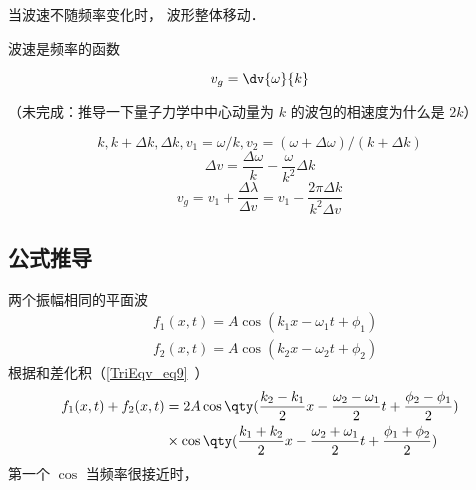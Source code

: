 
\begin{issues}
\issueDraft
\end{issues}


当波速不随频率变化时， 波形整体移动．

波速是频率的函数

\begin{equation}
v_g = \dv{\omega}{k}
\end{equation}

（未完成：推导一下量子力学中中心动量为 $k$ 的波包的相速度为什么是 $2k$）

\begin{equation}
k, k+\Delta k, \Delta k, v_1 = \omega/k, v_2 = (\omega+\Delta\omega)/(k+\Delta k)
\end{equation}
\begin{equation}
\Delta v = \frac{\Delta \omega}{k} - \frac{\omega}{k^2}\Delta k
\end{equation}
\begin{equation}
v_g = v_1 + \frac{\Delta \lambda}{\Delta v} = v_1 - \frac{2\pi\Delta k}{k^2\Delta v}
\end{equation}

\subsection{公式推导}
两个振幅相同的平面波
\begin{equation}
\begin{aligned}
&f_1(x,t) = A\cos(k_1 x - \omega_1 t + \phi_1)\\
&f_2(x,t) = A\cos(k_2 x - \omega_2 t + \phi_2)
\end{aligned}
\end{equation}
根据和差化积（\autoref{TriEqv_eq9}~）
\begin{equation}
\begin{aligned}
f_1(x,t) + f_2(x,t) &= 2 A \cos \qty(\frac{k_2-k_1}{2}x - \frac{\omega_2-\omega_1}{2}t + \frac{\phi_2 - \phi_1}{2})\\
& \times \cos \qty(\frac{k_1+k_2}{2}x - \frac{\omega_{2}+\omega_{1}}{2}t + \frac{\phi_1 + \phi_2}{2})
\end{aligned}
\end{equation}
第一个 $\cos$ 当频率很接近时， 
\begin{equation}

\end{equation}

